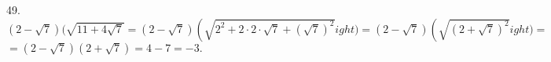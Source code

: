 49. $(2-\sqrt{7})(\sqrt{11+4\sqrt{7}}=(2-\sqrt{7})\left(\sqrt{2^2+2\cdot2\cdot\sqrt{7}+(\sqrt{7})^2}
ight)=(2-\sqrt{7})\left(\sqrt{(2+\sqrt{7})^2}
ight)=$\\$=
(2-\sqrt{7})(2+\sqrt{7})=4-7=-3.$\\
